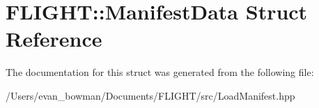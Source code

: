 \hypertarget{struct_f_l_i_g_h_t_1_1_manifest_data}{}\section{F\+L\+I\+G\+HT\+:\+:Manifest\+Data Struct Reference}
\label{struct_f_l_i_g_h_t_1_1_manifest_data}


The documentation for this struct was generated from the following file\+:\begin{DoxyCompactItemize}
\item 
/\+Users/evan\+\_\+bowman/\+Documents/\+F\+L\+I\+G\+H\+T/src/Load\+Manifest.\+hpp\end{DoxyCompactItemize}
